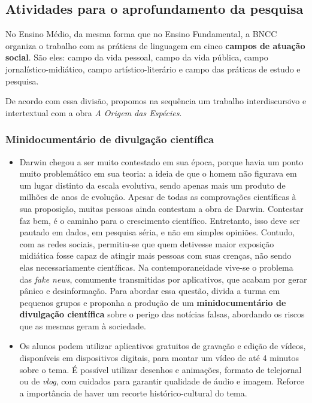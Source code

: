 \documentclass[11pt]{extarticle}
\begin{document}
\subsection{Atividades para o aprofundamento da pesquisa}

No Ensino Médio, da mesma forma que no Ensino Fundamental, a BNCC organiza
o trabalho com as práticas de linguagem em cinco \textbf{campos de atuação
social}. São eles: campo da vida pessoal, campo da vida pública, campo
jornalístico-midiático, campo artístico-literário e campo das práticas de
estudo e pesquisa.

De acordo com essa divisão, propomos na sequência um trabalho interdiscursivo
e intertextual com a obra \emph{A Origem das Espécies}.
	

\subsubsection{Minidocumentário de
      divulgação científica}

\begin{itemize} \item Darwin chegou a ser muito contestado em sua época, porque
      havia um ponto muito problemático em sua teoria: a ideia de que o homem
      não figurava em um lugar distinto da escala evolutiva, sendo apenas mais
      um produto de milhões de anos de evolução. Apesar de todas as
      comprovações científicas à sua proposição, muitas pessoas ainda contestam
      a obra de Darwin. Contestar faz bem, é o caminho para o crescimento
      científico. Entretanto, isso deve ser pautado em dados, em pesquisa
      séria, e não em simples opiniões. Contudo, com as redes sociais,
      permitiu-se que quem detivesse maior exposição midiática fosse capaz de
      atingir mais pessoas com suas crenças, não sendo elas necessariamente
      científicas. Na contemporaneidade vive-se o problema das \emph{fake
      news}, comumente transmitidas por aplicativos, que acabam por gerar
      pânico e desinformação. Para abordar essa questão, divida a turma em
      pequenos grupos e proponha a produção de um \textbf{minidocumentário de
      divulgação científica} sobre o perigo das notícias falsas, abordando os
      riscos que as mesmas geram à sociedade. 

\item Os alunos podem utilizar aplicativos gratuitos de gravação
  e edição de vídeos, disponíveis em dispositivos digitais, para montar um
  vídeo de até 4 minutos sobre o tema. É possível utilizar desenhos
  e animações, formato de telejornal ou de \emph{vlog}, com cuidados para
  garantir qualidade de áudio e imagem. Reforce a importância de haver um
recorte histórico-cultural do tema.  \end{itemize}
\end{document}
